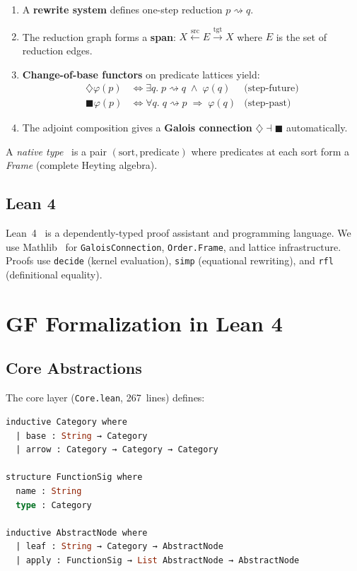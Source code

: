 \documentclass[11pt]{article}
\newcommand{\code}[1]{\texttt{#1}}
\newcommand{\Dia}{\ensuremath{\diamondsuit}}
\newcommand{\Bx}{\ensuremath{\blacksquare}}
\begin{document}
\begin{enumerate}
\item A \textbf{rewrite system} defines one-step reduction $p \rightsquigarrow q$.
\item The reduction graph forms a \textbf{span}:
  $X \xleftarrow{\mathrm{src}} E \xrightarrow{\mathrm{tgt}} X$
  where $E$ is the set of reduction edges.
\item \textbf{Change-of-base functors} on predicate lattices yield:
  \begin{align*}
    \Dia\varphi(p) &\iff \exists q.\; p \rightsquigarrow q \;\wedge\; \varphi(q)
    & \text{(step-future)} \\
    \Bx\varphi(p) &\iff \forall q.\; q \rightsquigarrow p \;\Rightarrow\; \varphi(q)
    & \text{(step-past)}
  \end{align*}
\item The adjoint composition gives a \textbf{Galois connection}
  $\Dia \dashv \Bx$ automatically.
\end{enumerate}

A \emph{native type}~\cite{WilliamsStay2021} is a pair $(\text{sort},
\text{predicate})$ where predicates at each sort form a \emph{Frame}
(complete Heyting algebra).

\subsection{Lean 4}

Lean~4~\cite{Moura2021} is a dependently-typed proof assistant and
programming language.  We use Mathlib~\cite{mathlib2020} for
\code{GaloisConnection}, \code{Order.Frame}, and lattice infrastructure.
Proofs use \code{decide} (kernel evaluation), \code{simp} (equational
rewriting), and \code{rfl} (definitional equality).

\section{GF Formalization in Lean 4}
\label{sec:formalization}
\label{sec:gf}

\subsection{Core Abstractions}

The core layer (\code{Core.lean}, 267~lines) defines:

\begin{lstlisting}[language=ml,caption={Core GF types}]
inductive Category where
  | base : String → Category
  | arrow : Category → Category → Category

structure FunctionSig where
  name : String
  type : Category

inductive AbstractNode where
  | leaf : String → Category → AbstractNode
  | apply : FunctionSig → List AbstractNode → AbstractNode
\end{lstlisting}
\end{document}
